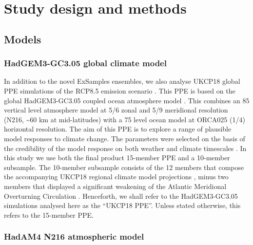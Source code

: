 \section{Study design and methods}

  \subsection{Models}
  
    \subsubsection{HadGEM3-GC3.05 global climate model}

      In addition to the novel ExSamples ensembles, we also analyse UKCP18 global PPE simulations of the RCP8.5 emission scenario \citep{riahi_rcp_2011}. This PPE is based on the global HadGEM3-GC3.05 coupled ocean atmosphere model \citep{murphy_ukcp18_2018,williams_met_2018}. This combines an 85 vertical level atmosphere model at 5/6\textdegree{} zonal and 5/9\textdegree{} meridional resolution (N216, \textasciitilde60 km at mid-latitudes) with a 75 level ocean model at ORCA025 (1/4\textdegree) horizontal resolution. The aim of this PPE is to explore a range of plausible model responses to climate change. The parameters were selected on the basis of the credibility of the model response on both weather and climate timescales \citep{karmalkar_finding_2019,sexton_finding_2019,sexton_perturbed_2021,yamazaki_perturbed_2021}. In this study we use both the final product 15-member PPE and a 10-member subsample. The 10-member subsample consists of the 12 members that compose the accompanying UKCP18 regional climate model projections \citep{murphy_ukcp18_2018}, minus two members that displayed a significant weakening of the Atlantic Meridional Overturning Circulation \citep{sexton_assessment_2020}. Henceforth, we shall refer to the HadGEM3-GC3.05 simulations analysed here as the ``UKCP18 PPE''. Unless stated otherwise, this refers to the 15-member PPE.
    
    \subsubsection{HadAM4 N216 atmospheric model}

